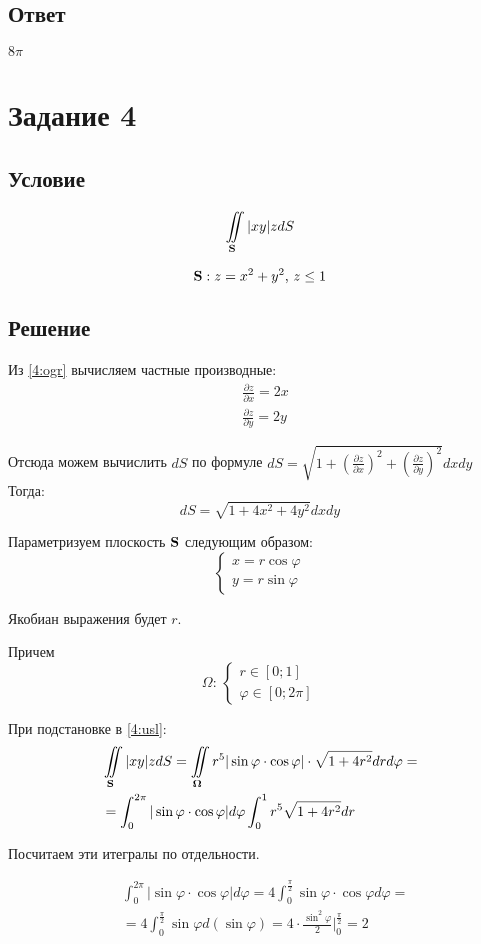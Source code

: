 \documentclass{report}
\newcommand*\task[1]{
       \chapter{#1}
       \section{Условие}
}
\newcommand*\doubleint[2]{\iint\limits_{#1}#2}
\newcommand*\doubleintlabel[3]{
       \begin{equation}
              \label{#3}
              \iint\limits_{#1}#2
       \end{equation}
}
\newcommand*\coordchtwo[2]{
       \begin{cases}
              x = #1\\
              y = #2
       \end{cases}
}
\newcommand*\partialofby[2]{\frac{\partial #1}{\partial #2}}
\begin{document}
\section{Ответ}

$8\pi$

\task{Задание 4}

\doubleintlabel{{\bf{S}}}{|xy|z dS}{4:usl}
\begin{equation}
    \label{4:ogr}
    {\bf{S}}: z = x^2 + y^2 \mbox{, } z \leq 1
\end{equation}

\section{Решение}

Из \ref{4:ogr} вычисляем частные производные:
\begin{align*}
     & \partialofby{z}{x} = 2x \\
     & \partialofby{z}{y} = 2y
\end{align*}

Отсюда можем вычислить $dS$ по формуле $dS = \sqrt{1 + (\partialofby{z}{x})^2 + (\partialofby{z}{y})^2}dx dy$
Тогда:
$$
    dS = \sqrt{1 + 4x^2 + 4y^2}dx dy
$$

Параметризуем плоскость ${\bf{S}}$ следующим образом:
$$
    \coordchtwo{r \cos \varphi}{r \sin \varphi}
$$

Якобиан выражения будет $r$.


Причем
$$
    \Omega \mbox{: } \begin{cases}
        r \in [0;1] \\
        \varphi \in [0; 2\pi]
    \end{cases}
$$


При подстановке в \ref{4:usl}:
\begin{align*}
     & \doubleint{{\bf{S}}}{|xy|z dS} = \doubleint{{\bf{\Omega}}}{r^5|\sin \varphi \cdot \cos \varphi| \cdot \sqrt{1 + 4r^2} dr d \varphi} = \\
     & = \int_{0}^{2\pi} |\sin \varphi \cdot \cos \varphi| d \varphi \int_{0}^{1} r^5 \sqrt{1 + 4r^2} dr
\end{align*}

Посчитаем эти итегралы по отдельности.

\begin{align*}
     & \int_{0}^{2\pi} |\sin \varphi \cdot \cos \varphi| d \varphi = 4 \int_{0}^{\frac{\pi}{2}} \sin \varphi \cdot \cos \varphi d \varphi = \\
     & = 4 \int_{0}^{\frac{\pi}{2}} \sin \varphi d(\sin \varphi) = 4 \cdot \frac{\sin^2 \varphi}{2}\Biggr|_{0}^{\frac{\pi}{2}} = 2
\end{align*}
\end{document}

